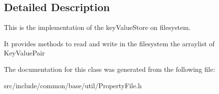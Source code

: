 \subsection{Detailed Description}
This is the implementation of the key\-Value\-Store on filesystem. 

It provides methods to read and write in the filesystem the arraylist of Key\-Value\-Pair 



The documentation for this class was generated from the following file:\begin{CompactItemize}
\item 
src/include/common/base/util/Property\-File.h\end{CompactItemize}
